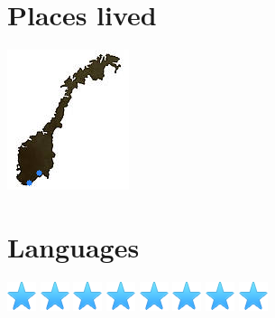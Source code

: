 \documentclass[]{cv-class}
\begin{document}
\begin{aside}
  \vspace{1cm}
  \section{Places lived}
    \includegraphics[scale=0.62]{img/norway.png}
    ~
  \section{Languages}
    {\includegraphics[scale=0.30]{img/star.png}
    \includegraphics[scale=0.30]{img/star.png}
    \includegraphics[scale=0.30]{img/star.png}
    \includegraphics[scale=0.30]{img/star.png}
    \includegraphics[scale=0.30]{img/star.png}}
    {\includegraphics[scale=0.30]{img/star.png}
    \includegraphics[scale=0.30]{img/star.png}
    \includegraphics[scale=0.30]{img/star.png}
}
\end{aside}
\end{document}

